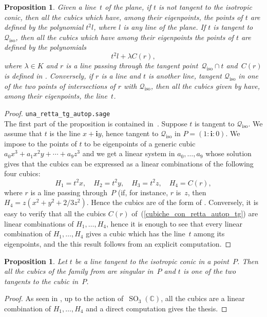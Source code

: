 \documentclass{amsart}
\theoremstyle{plain}
\newtheorem{prop}[lemma]{Proposition}
\theoremstyle{definition}
\newcommand{\C}{\mathbb{C}}
\newcommand{\iso}{\mathcal{Q}_{\mathrm{iso}}}
\newcommand{\SO}{\operatorname{SO}}
\newcommand{\iii}{\textbf{i}}
\begin{document}
\begin{prop}
\label{prop:eigenline_non_tangent}
Given a line~$t$ of the plane, if $t$ is not tangent to the isotropic
conic, then all the cubics which have, among their
eigenpoints, the points of $t$ are defined by the polynomial $t^2l$,
where $l$ is any line of the plane. If $t$ is tangent to $\iso$, then
all the cubics which have among their eigenpoints the points of $t$ are
defined by the polynomials
%
\begin{equation}
\label{cubiche_con_retta_autop_tg}
  t^2l+\lambda C(r),
\end{equation}
%
where $\lambda \in K$ and $r$ is a line
passing through the tangent point~$\iso \cap t$ and~$C(r)$ is defined
in . Conversely, if $r$ is a line and
$t$ is another line, tangent $\iso$ in one of the two points of intersections
of $r$ with $\iso$, then all the cubics given
by  have, among their eigenpoints,
the line~$t$.
\end{prop}
\begin{proof}
\verb+una_retta_tg_autop.sage+\\
The first part of the proposition is contained in~.
Suppose $t$ is tangent to $\iso$. We assume that $t$ is the line
$x+\iii y$, hence tangent to $\iso$ in $P = (1: \iii: 0)$.
We impose to the points
of $t$ to be eigenpoints of a generic cubic $a_0x^3+a_1x^2y+\cdots+a_9z^3$
and we get a linear system in $a_0, \dots, a_9$ whose solution gives that
the cubics can be expressed as a linear combinations of the following
four cubics:
%
\[
  H_1 = t^2x, \quad
  H_2 = t^2y, \quad
  H_3 = t^2z, \quad
  H_4 = C(r),
\]
%
where $r$ is a line passing through~$P$ (if, for instance, $r$
is~$z$, then $H_4 = z(x^2 + y^2 + 2/3z^2)$. Hence the cubics are of the
form of . Conversely, it is easy to verify
that all the cubics $C(r)$ of~(\ref{cubiche_con_retta_autop_tg}) are
linear combinations of $H_1, \dots, H_4$, hence it is enough
to see that every linear combination of $H_1, \dots, H_4$ gives a
cubic which has the line~$t$ among its eigenpoints, and the this result
follows from an explicit computation.
\end{proof}

\begin{prop}
Let $t$ be a line tangent to the isotropic conic in a point~$P$.
Then all the cubics of the family from  are singular in~$P$ and $t$ is one of the two tangents to the cubic in~$P$.
\end{prop}
\begin{proof}
As seen in , up to the action of~$\SO_3(\C)$, all the
cubics are a linear combination of $H_1, \dots, H_4$ and a direct
computation gives the thesis.
\end{proof}
\end{document}
